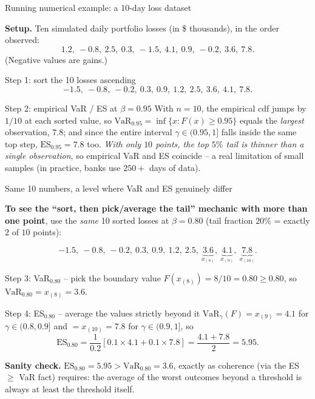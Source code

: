 \documentclass[aspectratio=169,10pt]{beamer}
\newcommand{\1}{\mathbb{1}}
\begin{document}
\begin{frame}{Running numerical example: a 10-day loss dataset}

\textbf{Setup.} Ten simulated daily portfolio losses (in \$ thousands), in the order observed:
\[
1.2,\ -0.8,\ 2.5,\ 0.3,\ -1.5,\ 4.1,\ 0.9,\ -0.2,\ 3.6,\ 7.8.
\]
(Negative values are gains.)

\begin{block}{Step 1: sort the 10 losses ascending}
\[
-1.5,\ -0.8,\ -0.2,\ 0.3,\ 0.9,\ 1.2,\ 2.5,\ 3.6,\ 4.1,\ 7.8.
\]
\end{block}

\begin{block}{Step 2: empirical VaR / ES at $\beta=0.95$}
With $n=10$, the empirical cdf jumps by $1/10$ at each sorted value, so $\mathrm{VaR}_{0.95} = \inf\{x: F(x)\ge 0.95\}$ equals the \emph{largest} observation, $7.8$; and since the entire interval $\gamma \in (0.95,1]$ falls inside the same top step, $\mathrm{ES}_{0.95} = 7.8$ too. \emph{With only $10$ points, the top $5\%$ tail is thinner than a single observation}, so empirical VaR and ES coincide -- a real limitation of small samples (in practice, banks use $250+$ days of data).
\end{block}

\end{frame}

\begin{frame}{Same 10 numbers, a level where VaR and ES genuinely differ}

\textbf{To see the ``sort, then pick/average the tail'' mechanic with more than one point}, use the \emph{same} 10 sorted losses at $\beta=0.80$ (tail fraction $20\%$ = exactly $2$ of $10$ points):

\[
-1.5,\ -0.8,\ -0.2,\ 0.3,\ 0.9,\ 1.2,\ 2.5,\ \underbrace{3.6}_{x_{(8)}},\ \underbrace{4.1}_{x_{(9)}},\ \underbrace{7.8}_{x_{(10)}}.
\]

\begin{block}{Step 3: VaR$_{0.80}$ -- pick the boundary value}
$F(x_{(8)}) = 8/10 = 0.80 \ge 0.80$, so $\mathrm{VaR}_{0.80} = x_{(8)} = 3.6$.
\end{block}

\begin{block}{Step 4: ES$_{0.80}$ -- average the values strictly beyond it}
$\mathrm{VaR}_\gamma(F) = x_{(9)}=4.1$ for $\gamma \in (0.8,0.9]$ and $=x_{(10)}=7.8$ for $\gamma\in(0.9,1]$, so
\[
\mathrm{ES}_{0.80} = \frac{1}{0.2}\left[ 0.1 \times 4.1 + 0.1 \times 7.8 \right] = \frac{4.1+7.8}{2} = 5.95.
\]
\end{block}

\textbf{Sanity check.} $\mathrm{ES}_{0.80}=5.95 > \mathrm{VaR}_{0.80}=3.6$, exactly as coherence (via the ES $\ge$ VaR fact) requires: the average of the worst outcomes beyond a threshold is always at least the threshold itself.

\end{frame}
\end{document}
